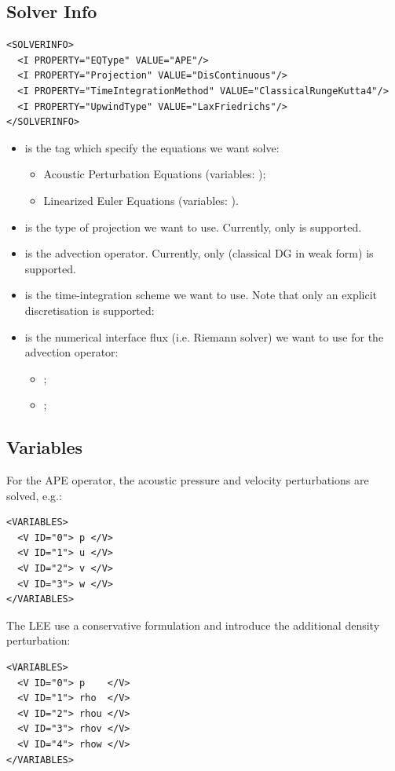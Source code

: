 \subsection{Solver Info}
\begin{lstlisting}[style=XmlStyle]
<SOLVERINFO>
  <I PROPERTY="EQType" VALUE="APE"/>
  <I PROPERTY="Projection" VALUE="DisContinuous"/>
  <I PROPERTY="TimeIntegrationMethod" VALUE="ClassicalRungeKutta4"/>
  <I PROPERTY="UpwindType" VALUE="LaxFriedrichs"/>
</SOLVERINFO>
\end{lstlisting}
\begin{itemize}
    \item {} is the tag which specify the equations we want solve:
    \begin{itemize}
        \item {} Acoustic Perturbation Equations (variables: );
        \item {} Linearized Euler Equations (variables: ).
    \end{itemize}
    \item {} is the type of projection we want to use. Currently, only  is supported.
    \item {} is the advection operator. Currently, only  (classical DG in weak form) is supported.
    \item {} is the time-integration scheme we want to use. 
    Note that only an explicit discretisation is supported:
    \item {} is the numerical interface flux (i.e. Riemann solver) 
    we want to use for the advection operator:
    \begin{itemize}
        \item {};
        \item {}; 
    \end{itemize}
\end{itemize}

\subsection{Variables}
For the APE operator, the acoustic pressure and velocity perturbations are solved, e.g.:
\begin{lstlisting}[style=XmlStyle]
<VARIABLES>
  <V ID="0"> p </V>
  <V ID="1"> u </V>
  <V ID="2"> v </V>
  <V ID="3"> w </V>
</VARIABLES>
\end{lstlisting}
The LEE use a conservative formulation and introduce the additional density perturbation:
\begin{lstlisting}[style=XmlStyle]
<VARIABLES>
  <V ID="0"> p    </V>
  <V ID="1"> rho  </V>
  <V ID="2"> rhou </V>
  <V ID="3"> rhov </V>
  <V ID="4"> rhow </V>
</VARIABLES>
\end{lstlisting}



